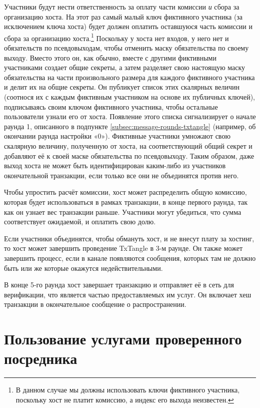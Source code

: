 Участники будут нести ответственность за оплату части комиссии {\em и} сбора за организацию хоста. На этот раз самый малый ключ фиктивного участника (за исключением ключа хоста) будет должен оплатить оставшуюся часть комиссии и сбора за организацию хоста.\footnote{В данном случае мы должны использовать ключи фиктивного участника, поскольку хост не платит комиссию, а индекс его выхода неизвестен.} Посколь\-ку у хоста нет входов, у него нет и обязательств по псевдовыходам, чтобы отменить маску обязательства по своему выходу. Вместо этого он, как обычно, вместе с другими фиктивными участниками создает общие секреты, а затем разделяет свою настоящую маску обязательства на части произвольного размера для каждого фиктивного участника и делит их на общие секреты. Он публикует список этих скалярных величин (соотнося их с каждым фиктивным участником на основе их публичных ключей), подписываясь своим ключом фиктивного участ\-ника, чтобы остальные пользователи узнали его от хоста. Появление этого списка сигнализи\-рует о начале раунда 1, описанного в подпункте \ref{subsec:message-rounds-txtangle} (например, об окончании раунда настройки «0»). Фиктивные участники умножают свою скалярную величину, полученную от хоста, на соответствующий общий секрет и добавляют её к своей маске обязательства по псевдовыходу. Таким образом, даже выход хоста не может быть идентифицирован каким-либо из участников окончательной транзакции, если только все они  не объединятся против него.

Чтобы упростить расчёт комиссии, хост может распределить общую комиссию, которая будет использоваться в рамках транзакции, в конце первого раунда, так как он узнает вес транзак\-ции раньше. Участники могут убедиться, что сумма соответствует ожидаемой, и оплатить свою долю.

Если участники объединятся, чтобы обмануть хост, и не внесут плату за хостинг, то хост может завершить проведение TxTangle в 3-м раунде. Он также может завершить процесс, если в канале появляются сообщения, которых там не должно быть или же которые окажутся недействительными.

В конце 5-го раунда хост завершает транзакцию и отправляет её в сеть для верификации, что является частью предоставляемых им услуг. Он включает хеш транзакции в окончательное сообщение о распространении.



\section{Пользование услугами проверенного посредника}
\label{sec:dealer-txtangle}

